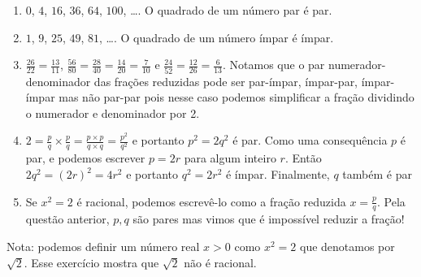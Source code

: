 \begin{enumerate}
\item $0$, $4$, $16$, $36$, $64$, $100$, \ldots. O quadrado de um número par é
  par.
\item $1$, $9$, $25$, $49$, $81$, \ldots. O quadrado de um número ímpar é ímpar.
\item $\frac{26}{22} = \frac{13}{11}$,
  $\frac{56}{80} = \frac{28}{40} = \frac{14}{20} = \frac{7}{10}$ e
  $\frac{24}{52} = \frac{12}{26} = \frac{6}{13}$.
  Notamos que o par numerador-denominador das frações reduzidas pode ser
  par-ímpar, ímpar-par, ímpar-ímpar mas não par-par pois nesse caso podemos
  simplificar a fração dividindo o numerador e denominador por 2.
\item $2 = \frac{p}{q} \times \frac{p}{q} = \frac{p \times p}{q \times q}
= \frac{p^2}{q^2}$ e portanto $p^2 = 2 q^2$ é par.
Como uma consequência $p$ é par, e podemos escrever $p = 2r$ para algum inteiro
$r$. Então $2 q^2 = \left(2r\right)^2 = 4 r^2$ e portanto
$q^2 = 2 r^2$ é ímpar. Finalmente, $q$ também é par
\item Se $x^2 = 2$ é racional, podemos escrevê-lo como a fração reduzida
  $x = \frac{p}{q}$. Pela questão anterior, $p, q$ são pares mas vimos que é
  impossível reduzir a fração!
\end{enumerate}

Nota: podemos definir um número real $x > 0$ como $x^2 = 2$ que denotamos por
$\sqrt{2}$. Esse exercício mostra que $\sqrt{2}$ não é racional.
